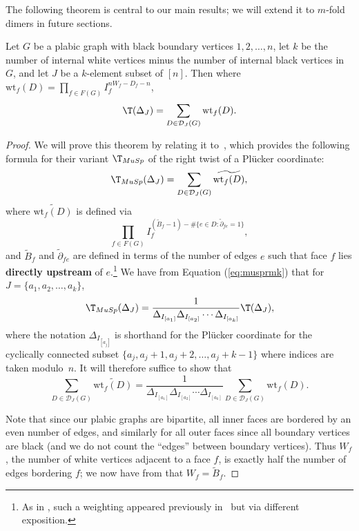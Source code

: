 The following theorem is central to our main results; we will extend it to $m$-fold dimers in future sections.
\begin{theorem}\label{theorem:facewts}
Let $G$ be a plabic graph with black boundary vertices $1,2, \dots, n$, let $k$ be the number of internal white vertices minus the number of internal black vertices in~$G$, and let $J$ be a $k$-element subset of $[n]$. Then where $\text{wt}_f(D)=\prod_{f \in F(G)} I_f^{nW_f-D_f-n}$,
\[\T(\Delta_J) = \sum_{D \in \mathcal{D}_J(G)} \text{wt}_f(D).\]
\end{theorem}
\begin{proof}
We will prove this theorem by relating it to~\cite[Remark~7.11]{mullerspeyer}, which provides the following formula for their variant $\T_{MuSp}$ of the right twist of a Pl\"ucker coordinate:
\[\T_{MuSp}(\Delta_J) = \sum_{D \in \mathcal{D}_J(G)} \widetilde{\text{wt}_f(D)},\]
where $\widetilde{\text{wt}_f(D)}$ is defined via \[\prod_{f \in F(G)} I_f^{(\tilde{B}_f-1) - \#\{e \in D : \tilde{\partial}_{fe} = 1\}},\] and $\tilde{B}_f$ and $\tilde{\partial}_{fe}$ are defined in terms of the number of edges $e$ such that face $f$ lies \textbf{directly upstream} of $e$.\footnote{As in \cite[Remark 5.8]{mullerspeyer}, such a weighting appeared previously in~\cite{octahedron} but via different exposition.} 
We have from Equation (\ref{eq:musprmk}) that for $J = \{a_1,a_2,\dots, a_k\}$,
\[\T_{MuSp}(\Delta_J) =  \frac{1}{\Delta_{I_{[a_1]}}\Delta_{I_{[a_2]}}\cdots \Delta_{I_{[a_k]}}} \T(\Delta_J),\]
where the notation $\Delta_{I_{[a_j]}}$ is shorthand for the Pl\"ucker coordinate for the cyclically connected subset $\{a_j, a_j+1, a_j+2, \dots, a_j + k-1\}$ where indices are taken modulo~$n$. It will therefore suffice to show that
\begin{equation}\label{eq:muspfacewts}
\sum_{D \in \mathcal{D}_J(G)} \widetilde{\text{wt}_f(D)} = \frac{1}{\Delta_{I_{[a_1]}}\Delta_{I_{[a_2]}}\cdots \Delta_{I_{[a_k]}}} \sum_{D \in \mathcal{D}_J(G)} \text{wt}_f(D).
\end{equation}

Note that since our plabic graphs are bipartite, all inner faces are bordered by an even number of edges, and similarly for all outer faces since all boundary vertices are black (and we do not count the ``edges'' between boundary vertices). Thus $W_f$, the number of white vertices adjacent to a face $f$, is exactly half the number of edges bordering $f$; we now have from \cite[Section 5.1]{mullerspeyer} that $W_f=\tilde{B}_f$.


\end{proof}
